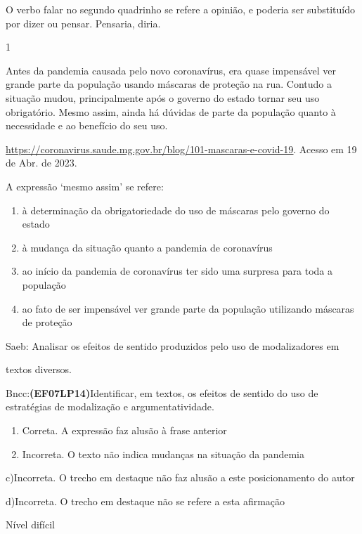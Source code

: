 {{\begin{escolha}
O verbo falar no segundo quadrinho se refere a opinião, e poderia ser
substituído por dizer ou pensar. Pensaria, diria.


\num{1}

Antes da pandemia causada pelo novo coronavírus, era quase impensável
ver grande parte da população usando máscaras de proteção na rua.
Contudo a situação mudou, principalmente após o governo do estado tornar
seu uso obrigatório. Mesmo assim, ainda há dúvidas de parte da população
quanto à necessidade e ao benefício do seu uso.

\href{https://coronavirus.saude.mg.gov.br/blog/101-mascaras-e-covid-19}{\uline{https://coronavirus.saude.mg.gov.br/blog/101-mascaras-e-covid-19}}.
Acesso em 19 de Abr. de 2023.

A expressão `mesmo assim' se refere:

\begin{enumerate}
\def\labelenumi{\alph{enumi})}
\item
  à determinação da obrigatoriedade do uso de máscaras pelo governo do
  estado
\item
  à mudança da situação quanto a pandemia de coronavírus
\item
  ao início da pandemia de coronavírus ter sido uma surpresa para toda a
  população
\item
  ao fato de ser impensável ver grande parte da população utilizando
  máscaras de proteção
\end{enumerate}

Saeb: Analisar os efeitos de sentido produzidos pelo uso de
modalizadores em

textos diversos.

Bncc:\textbf{(EF07LP14)}Identificar, em textos, os efeitos de sentido do
uso de estratégias de modalização e argumentatividade.

\begin{enumerate}
\def\labelenumi{\arabic{enumi}.}
\item
  Correta. A expressão faz alusão à frase anterior
\item
  Incorreta. O texto não indica mudanças na situação da pandemia
\end{enumerate}

c)Incorreta. O trecho em destaque não faz alusão a este posicionamento
do autor

d)Incorreta. O trecho em destaque não se refere a esta afirmação

Nível difícil


\end{escolha}}}

